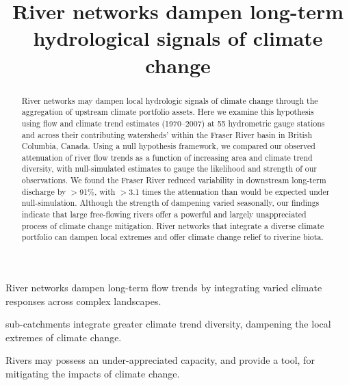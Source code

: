 \documentclass{AGUJournal}
\begin{document}

\title{River networks dampen long-term hydrological signals of climate change}







\begin{keypoints}
\item River networks dampen long-term flow trends by integrating varied climate responses across complex landscapes.
\item {} sub-catchments integrate greater climate trend diversity, dampening the local extremes of climate change.
\item Rivers may possess an under-appreciated capacity, and provide a tool, for mitigating the impacts of climate change.
\end{keypoints}


\begin{abstract}
	River networks may dampen local hydrologic signals of climate change through the aggregation of upstream climate portfolio assets. Here we examine this hypothesis using flow and climate trend estimates (1970--2007) at 55 hydrometric gauge stations and across their contributing watersheds' within the Fraser River basin in British Columbia, Canada. Using a null hypothesis framework, we compared our observed attenuation of river flow trends as a function of increasing area and climate trend diversity, with null-simulated estimates to gauge the likelihood and strength of our observations. We found the Fraser River reduced variability in downstream long-term discharge by $>$91\%, with $>$3.1 times the attenuation than would be expected under null-simulation. Although the strength of dampening varied seasonally, our findings indicate that large free-flowing rivers offer a powerful and largely unappreciated process of climate change mitigation. River networks that integrate a diverse climate portfolio can dampen local extremes and offer climate change relief to riverine biota.
\end{abstract}
\end{document}
